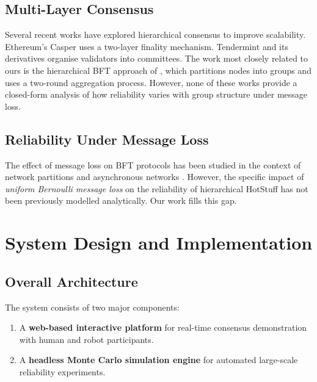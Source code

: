\documentclass[
12pt,
oneside,
singlespacing,
parskip,
]{article}
\begin{document}
\subsection{Multi-Layer Consensus}

Several recent works have explored hierarchical consensus to improve scalability. Ethereum's Casper \citep{buterin2017casper} uses a two-layer finality mechanism. Tendermint \citep{buchman2016tendermint} and its derivatives organise validators into committees. The work most closely related to ours is the hierarchical BFT approach of \citet{david2018ouroboros}, which partitions nodes into groups and uses a two-round aggregation process. However, none of these works provide a closed-form analysis of how reliability varies with group structure under message loss.

\subsection{Reliability Under Message Loss}

The effect of message loss on BFT protocols has been studied in the context of network partitions \citep{brewer2000cap} and asynchronous networks \citep{fischer1985impossibility}. However, the specific impact of \emph{uniform Bernoulli message loss} on the reliability of hierarchical HotStuff has not been previously modelled analytically. Our work fills this gap.

\section{System Design and Implementation}
\label{sec:design}

\subsection{Overall Architecture}

The system consists of two major components:

\begin{enumerate}
  \item A \textbf{web-based interactive platform} for real-time consensus demonstration with human and robot participants.
  \item A \textbf{headless Monte Carlo simulation engine} for automated large-scale reliability experiments.
\end{enumerate}
\end{document}
